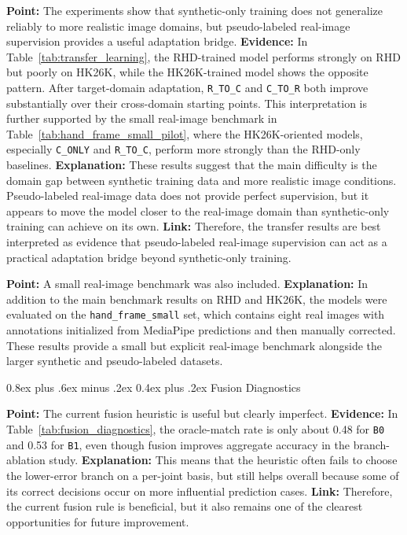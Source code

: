 \documentclass[10pt,letterpaper]{article}
\makeatletter
\renewcommand\subsubsection{\@startsection{subsubsection}{3}{\z@}%
  {0.8ex plus .6ex minus .2ex}%
  {0.4ex plus .2ex}%
  {\normalfont\small\itshape}}
\makeatother
\begin{document}
\medskip
\noindent\textbf{Point:} The experiments show that synthetic-only training does not generalize reliably to more realistic image domains, but pseudo-labeled real-image supervision provides a useful adaptation bridge.  
\textbf{Evidence:} In Table~\ref{tab:transfer_learning}, the RHD-trained model performs strongly on RHD but poorly on HK26K, while the HK26K-trained model shows the opposite pattern. After target-domain adaptation, \texttt{R\_TO\_C} and \texttt{C\_TO\_R} both improve substantially over their cross-domain starting points. This interpretation is further supported by the small real-image benchmark in Table~\ref{tab:hand_frame_small_pilot}, where the HK26K-oriented models, especially \texttt{C\_ONLY} and \texttt{R\_TO\_C}, perform more strongly than the RHD-only baselines.  
\textbf{Explanation:} These results suggest that the main difficulty is the domain gap between synthetic training data and more realistic image conditions. Pseudo-labeled real-image data does not provide perfect supervision, but it appears to move the model closer to the real-image domain than synthetic-only training can achieve on its own.  
\textbf{Link:} Therefore, the transfer results are best interpreted as evidence that pseudo-labeled real-image supervision can act as a practical adaptation bridge beyond synthetic-only training.

\medskip
\noindent\textbf{Point:} A small real-image benchmark was also included.  
\textbf{Explanation:} In addition to the main benchmark results on RHD and HK26K, the models were evaluated on the \texttt{hand\_frame\_small} set, which contains eight real images with annotations initialized from MediaPipe predictions and then manually corrected. These results provide a small but explicit real-image benchmark alongside the larger synthetic and pseudo-labeled datasets.

\subsubsection{Fusion Diagnostics}

\medskip
\noindent\textbf{Point:} The current fusion heuristic is useful but clearly imperfect.  
\textbf{Evidence:} In Table~\ref{tab:fusion_diagnostics}, the oracle-match rate is only about 0.48 for \texttt{B0} and 0.53 for \texttt{B1}, even though fusion improves aggregate accuracy in the branch-ablation study.  
\textbf{Explanation:} This means that the heuristic often fails to choose the lower-error branch on a per-joint basis, but still helps overall because some of its correct decisions occur on more influential prediction cases.  
\textbf{Link:} Therefore, the current fusion rule is beneficial, but it also remains one of the clearest opportunities for future improvement.
\end{document}

